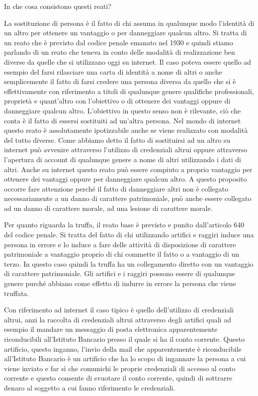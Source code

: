 \par

In che cosa consistono questi reati?\par
La sostituzione di persona è il fatto di chi assuma in qualunque modo l'identità di un altro per ottenere un vantaggio o per danneggiare qualcun altro. Si tratta di un reato che è previsto dal codice penale emanato nel 1930 e quindi stiamo parlando di un reato che teneva in conto delle modalità di realizzazione ben diverse da quelle che si utilizzano oggi su internet. Il caso poteva essere quello ad esempio del farsi rilasciare una carta di identità a nome di altri o anche semplicemente il fatto di farsi credere una persona diversa da quello che si è effettivamente con riferimento a titoli di qualunque genere qualifiche professionali, proprietà e quant'altro con l'obiettivo o di ottenere dei vantaggi oppure di danneggiare qualcun altro. L'obiettivo in questo senso non è rilevante, ciò che conta è il fatto di essersi sostituiti ad un'altra persona. Nel mondo di internet questo reato è assolutamente ipotizzabile anche se viene realizzato con modalità del tutto diverse. Come abbiamo detto il fatto di sostituirsi ad un altro su internet può avvenire attraverso l'utilizzo di credenziali altrui oppure attraverso l'apertura di account di qualunque genere a nome di altri utilizzando i dati di altri. Anche su internet questo reato può essere compiuto a proprio vantaggio per ottenere dei vantaggi oppure per danneggiare qualcun altro. A questo proposito occorre fare attenzione perché il fatto di danneggiare altri non è collegato necessariamente a un danno di carattere patrimoniale, può anche essere collegato ad un danno di carattere morale, ad una lesione di carattere morale.\par
Per quanto riguarda la truffa, il reato base è previsto e punito dall'articolo 640 del codice penale. Si tratta del fatto di chi utilizzando artifici e raggiri induce una persona in errore e lo induce a fare delle attività di disposizione di carattere patrimoniale a vantaggio proprio di chi commette il fatto o a vantaggio di un terzo. In questo caso quindi la truffa ha un collegamento diretto con un vantaggio di carattere patrimoniale. Gli artifici e i raggiri possono essere di qualunque genere purché abbiano come effetto di indurre in errore la persona che viene truffata.\par
Con riferimento ad internet il caso tipico è quello dell'utilizzo di credenziali altrui, anzi la raccolta di credenziali altrui attraverso degli artifici quali ad esempio il mandare un messaggio di posta elettronica apparentemente riconducibili all'Istituto Bancario presso il quale si ha il conto corrente. Questo artificio, questo inganno, l'invio della mail che apparentemente è riconducibile all'Istituto Bancario è un artificio che ha lo scopo di ingannare la persona a cui viene inviato e far sì che comunichi le proprie credenziali di accesso al conto corrente e questo consente di svuotare il conto corrente, quindi di sottrarre denaro al soggetto a cui fanno riferimento le credenziali.\par
